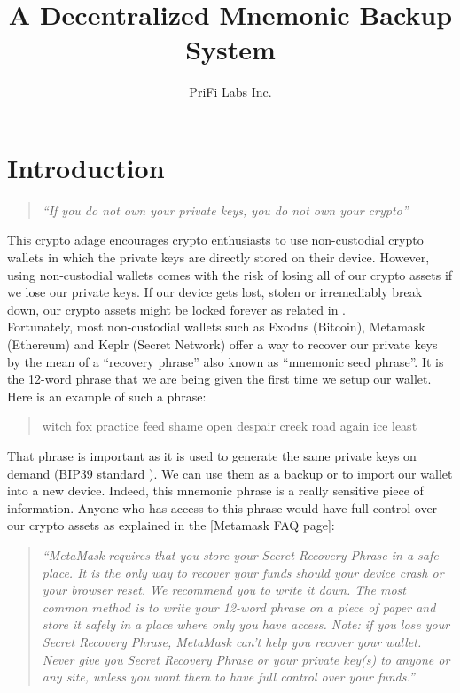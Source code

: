 \documentclass[12pt]{article}
\title{A Decentralized Mnemonic Backup System}
\author{PriFi Labs Inc.}
\date{}
\begin{document}
\maketitle

\begin{abstract}

\end{abstract}

\section{Introduction}

\begin{quote}
{\em ``If you do not own your private keys, you do not own your crypto''}
\end{quote}

This crypto adage encourages crypto enthusiasts to use non-custodial crypto wallets in which the private keys are directly stored on their device. However, using non-custodial wallets comes with the risk of losing all of our crypto assets if we lose our private keys. If our device gets lost, stolen or irremediably break down, our crypto assets might be locked forever as related in \cite{LostPasswords}.\\

Fortunately, most non-custodial wallets such as Exodus (Bitcoin), Metamask (Ethereum) and Keplr (Secret Network) offer a way to recover our private keys by the mean of a ``recovery phrase'' also known as ``mnemonic seed phrase''. It is the 12-word phrase that we are being given the first time we setup our wallet. Here is an example of such a phrase: 

\begin{quote}
witch fox practice feed shame open despair creek road again ice least
\end{quote}

That phrase is important as it is used to generate the same private keys on demand (BIP39 standard \cite{BIP39}). We can use them as a backup or to import our wallet into a new device. Indeed, this mnemonic phrase is a really sensitive piece of information. Anyone who has access to this phrase would have full control over our crypto assets as explained in the [Metamask FAQ page]\cite{MetamaskFAQ}:

\begin{quote}
{\em ``MetaMask requires that you store your Secret Recovery Phrase in a safe place. It is the only way to recover your funds should your device crash or your browser reset. We recommend you to write it down. The most common method is to write your 12-word phrase on a piece of paper and store it safely in a place where only you have access. Note: if you lose your Secret Recovery Phrase, MetaMask can’t help you recover your wallet. Never give you Secret Recovery Phrase or your private key(s) to anyone or any site, unless you want them to have full control over your funds.''}
\end{quote}
\end{document}
